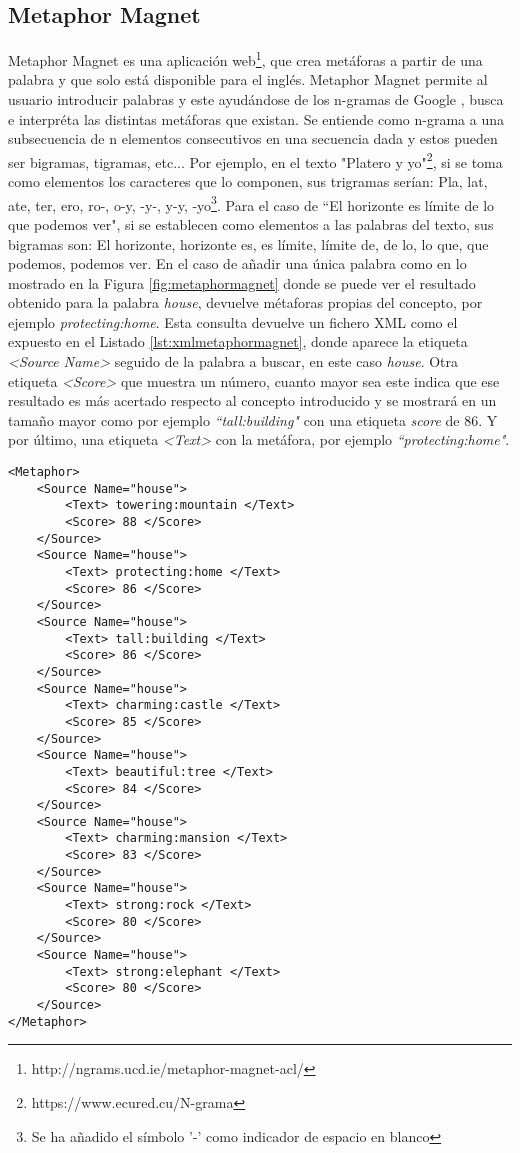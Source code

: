 \subsection{Metaphor Magnet}
\label{cap:subsec:metaphormagnet}
Metaphor Magnet es una aplicación web\footnote{http://ngrams.ucd.ie/metaphor-magnet-acl/}, que crea metáforas a partir de una palabra y que solo está disponible para el inglés.
Metaphor Magnet permite al usuario introducir palabras y este ayudándose de los n-gramas de Google \citep{VealeT2012}, busca e interpréta las distintas metáforas que existan.
Se entiende como n-grama \citep{ngrama1999} a una subsecuencia de n elementos consecutivos en una secuencia dada y estos pueden ser bigramas, tigramas, etc... Por ejemplo, en el texto "Platero y yo"\footnote{https://www.ecured.cu/N-grama}, si se toma como elementos los caracteres que lo componen, sus trigramas serían: Pla, lat, ate, ter, ero, ro-, o-y, -y-, y-y, -yo\footnote{Se ha añadido el símbolo '-'  como indicador de espacio en blanco}.
Para el caso de  ``El horizonte es límite de lo que podemos ver", si se establecen como elementos a las palabras del texto, sus bigramas son: El horizonte, horizonte es, es límite, límite de, de lo, lo que, que podemos, podemos ver.
En el caso de añadir una única palabra como en lo mostrado en la Figura \ref{fig:metaphormagnet} donde se puede ver el resultado obtenido para la palabra \textit{house}, devuelve métaforas propias del concepto, por ejemplo \textit{protecting:home}.
Esta consulta devuelve un fichero XML como el expuesto en el Listado \ref{lst:xmlmetaphormagnet}, donde aparece la etiqueta \textit{<Source Name>} seguido de la palabra a buscar, en este caso \textit{house}. Otra etiqueta \textit{<Score>} que muestra un número, cuanto mayor sea este indica que ese resultado es más acertado respecto al concepto introducido y se mostrará en un tamaño mayor como por ejemplo \textit{``tall:building"} con una etiqueta \textit{score} de 86. Y por último, una etiqueta \textit{<Text>} con la metáfora, por ejemplo \textit{``protecting:home"}.



\lstset{language=XML}
\begin{lstlisting}[caption= Ejemplo formatos XML Metaphor Magnet para la palabra \textit{house}, label={lst:xmlmetaphormagnet}, frame=single]
<Metaphor>
	<Source Name="house">
		<Text> towering:mountain </Text>
		<Score> 88 </Score>
	</Source>
	<Source Name="house">
		<Text> protecting:home </Text>
		<Score> 86 </Score>
	</Source>
	<Source Name="house">
		<Text> tall:building </Text>
		<Score> 86 </Score>
	</Source>
	<Source Name="house">
		<Text> charming:castle </Text>
		<Score> 85 </Score>
	</Source>
	<Source Name="house">
		<Text> beautiful:tree </Text>
		<Score> 84 </Score>
	</Source>
	<Source Name="house">
		<Text> charming:mansion </Text>
		<Score> 83 </Score>
	</Source>
	<Source Name="house">
		<Text> strong:rock </Text>
		<Score> 80 </Score>
	</Source>
	<Source Name="house">
		<Text> strong:elephant </Text>
		<Score> 80 </Score>
	</Source>
</Metaphor>
\end{lstlisting}





